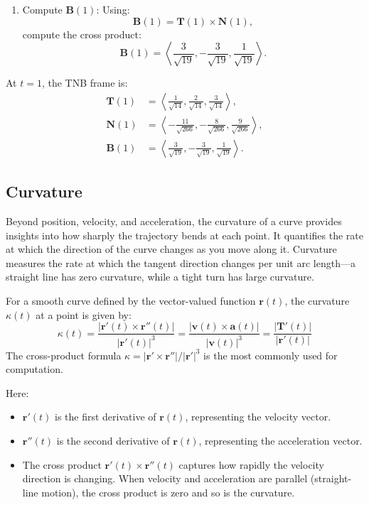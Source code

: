 \begin{example}
\begin{solution}
\begin{enumerate}
    \item Compute \( \mathbf{B}(1) \):
    Using:
    \[
    \mathbf{B}(1) = \mathbf{T}(1) \times \mathbf{N}(1),
    \]
    compute the cross product:
    \[
    \mathbf{B}(1) = \left\langle \frac{3}{\sqrt{19}}, -\frac{3}{\sqrt{19}}, \frac{1}{\sqrt{19}} \right\rangle.
    \]
\end{enumerate}

\noindent At \( t = 1 \), the TNB frame is:
\[
\begin{aligned}
\mathbf{T}(1) &= \left\langle \frac{1}{\sqrt{14}}, \frac{2}{\sqrt{14}}, \frac{3}{\sqrt{14}} \right\rangle, \\
\mathbf{N}(1) &= \left\langle -\frac{11}{\sqrt{266}}, -\frac{8}{\sqrt{266}}, \frac{9}{\sqrt{266}} \right\rangle, \\
\mathbf{B}(1) &= \left\langle \frac{3}{\sqrt{19}}, -\frac{3}{\sqrt{19}}, \frac{1}{\sqrt{19}} \right\rangle.
\end{aligned}
\]
\end{solution}
\end{example}
\exampleline





\subsection*{Curvature} 

\noindent Beyond position, velocity, and acceleration, the curvature of a curve provides insights into how sharply the trajectory bends at each point. It quantifies the rate at which the direction of the curve changes as you move along it. Curvature measures the rate at which the tangent direction changes per unit arc length---a straight line has zero curvature, while a tight turn has large curvature.

For a smooth curve defined by the vector-valued function \( \mathbf{r}(t) \), the curvature \( \kappa(t) \) at a point is given by:
\[
\kappa(t) = \frac{|\mathbf{r}'(t) \times \mathbf{r}''(t)|}{|\mathbf{r}'(t)|^3} = \frac{|\mathbf{v}(t) \times \mathbf{a}(t)|}{|\mathbf{v}(t)|^3} = \frac{|\mathbf{T}'(t)|}{|\mathbf{r}'(t)|}
\]
The cross-product formula \( \kappa = |\mathbf{r}' \times \mathbf{r}''| / |\mathbf{r}'|^3 \) is the most commonly used for computation.

Here:
\begin{itemize}
    \item \( \mathbf{r}'(t) \) is the first derivative of \( \mathbf{r}(t) \), representing the velocity vector.
    \item \( \mathbf{r}''(t) \) is the second derivative of \( \mathbf{r}(t) \), representing the acceleration vector.
    \item The cross product \( \mathbf{r}'(t) \times \mathbf{r}''(t) \) captures how rapidly the velocity direction is changing. When velocity and acceleration are parallel (straight-line motion), the cross product is zero and so is the curvature.
\end{itemize}

